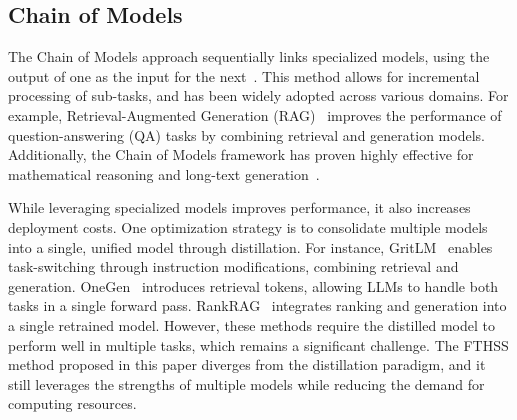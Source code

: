 \subsection{Chain of Models}

The Chain of Models approach sequentially links specialized models, using the output of one as the input for the next~\cite{zhang2024chain}. This method allows for incremental processing of sub-tasks, and has been widely adopted across various domains. For example, Retrieval-Augmented Generation (RAG)~\cite{lewis2020retrieval} improves the performance of question-answering (QA) tasks by combining retrieval and generation models. Additionally, the Chain of Models framework has proven highly effective for mathematical reasoning\cite{sun2023corex, dong2024effiqa, lei2024macm} and long-text generation~\cite{xi2025omnithink, wang2024autopatentmultiagentframeworkautomatic}.


While leveraging specialized models improves performance, it also increases deployment costs. One optimization strategy is to consolidate multiple models into a single, unified model through distillation. For instance, GritLM~\cite{muennighoff2024generative} enables task-switching through instruction modifications, combining retrieval and generation. OneGen~\cite{zhang2024onegen} introduces retrieval tokens, allowing LLMs to handle both tasks in a single forward pass. RankRAG~\cite{yu2024rankrag} integrates ranking and generation into a single retrained model. However, these methods require the distilled model to perform well in multiple tasks, which remains a significant challenge. The FTHSS method proposed in this paper diverges from the distillation paradigm, and it still leverages the strengths of multiple models while reducing the demand for computing resources.

